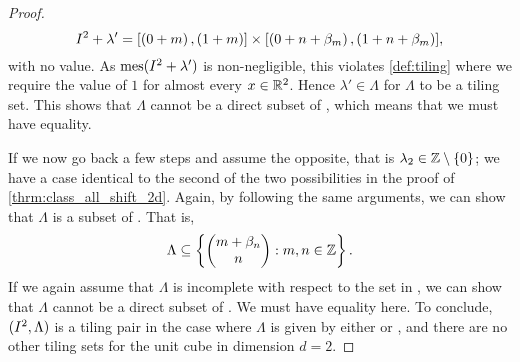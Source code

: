 \documentclass[../thesis.tex]{subfiles}
\begin{document}
\begin{proof}
    \begin{equation*}
        I^2 + \lambda' = [\left(0+m\right),\left(1+m\right)]\times [\left(0+n+\beta_m\right),\left(1+n+\beta_m\right)], 
    \end{equation*}
    with no value. As $\operatorname{mes}(I^2 + \lambda')$ is non-negligible, this violates \cref{def:tiling} where we require the value of $1$ for almost every $x\in \mathbb{R}^2$. Hence $\lambda'\in \Lambda$ for $\Lambda$ to be a tiling set. This shows that $\Lambda$ cannot be a direct subset of , which means that we must have equality.%
    
    If we now go back a few steps and assume the opposite, that is $\lambda_2 \in \mathbb{Z}\setminus\{0\}$; we have a case identical to the second of the two possibilities in the proof of \cref{thrm:class_all_shift_2d}. Again, by following the same arguments, we can show that $\Lambda$ is a subset of . That is,
    \begin{equation*}  %
        \Lambda \subseteq \braqMed{\begin{pmatrix} m +\beta_n \\ n\end{pmatrix} : m,n \in \Z}.
    \end{equation*}
    If we again assume that $\Lambda$ is incomplete with respect to the set in , we can show that $\Lambda$ cannot be a direct subset of . We must have equality here. To conclude, $(I^2, \Lambda)$ is a tiling pair in the case where $\Lambda$ is given by either  or , and there are no other tiling sets for the unit cube in dimension $d=2$.
\end{proof}
\end{document}
